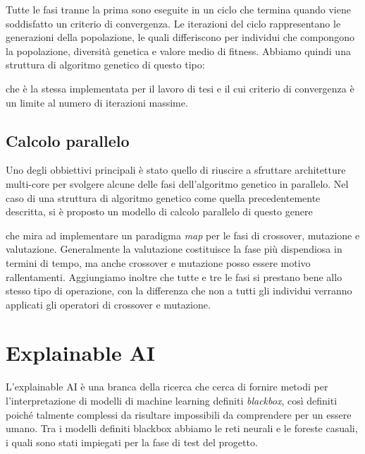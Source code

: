 Tutte le fasi tranne la prima sono eseguite in un ciclo che termina quando
viene soddisfatto un criterio di convergenza. Le iterazioni del ciclo
rappresentano le generazioni della popolazione, le quali differiscono per
individui che compongono la popolazione, diversità genetica e valore medio di
fitness. Abbiamo quindi una struttura di algoritmo genetico di questo tipo:

\begin{center}
	
\end{center}

che è la stessa implementata per il lavoro di tesi e il cui criterio di
convergenza è un limite al numero di iterazioni massime.

\subsection{Calcolo parallelo}

Uno degli obbiettivi principali è stato quello di riuscire a sfruttare
architetture multi-core per svolgere alcune delle fasi dell'algoritmo genetico
in parallelo. Nel caso di una struttura di algoritmo genetico come quella
precedentemente descritta, si è proposto un modello di calcolo parallelo di
questo genere

\begin{center}
	
\end{center}

che mira ad implementare un paradigma \textit{map} per le fasi di crossover,
mutazione e valutazione. Generalmente la valutazione costituisce la fase più
dispendiosa in termini di tempo, ma anche crossover e mutazione posso essere
motivo rallentamenti. Aggiungiamo inoltre che tutte e tre le fasi si prestano
bene allo stesso tipo di operazione, con la differenza che non a tutti gli
individui verranno applicati gli operatori di crossover e mutazione.

\section{Explainable AI}

L'explainable AI è una branca della ricerca che cerca di fornire metodi per
l'interpretazione di modelli di machine learning definiti \textit{blackbox},
così definiti poiché talmente complessi da risultare impossibili da comprendere
per un essere umano. Tra i modelli definiti blackbox abbiamo le reti neurali
e le foreste casuali, i quali sono stati impiegati per la fase di test del
progetto.

